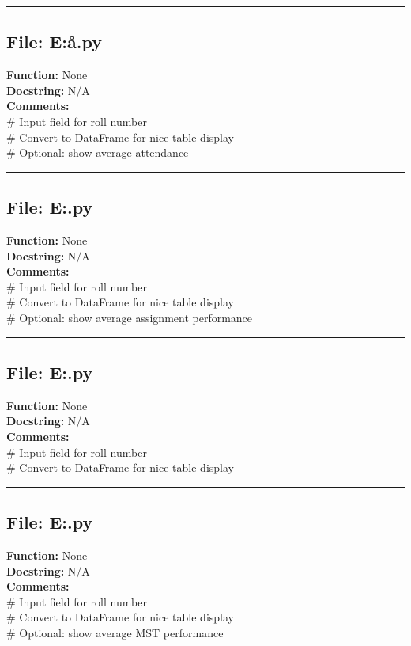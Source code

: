 {\hrule

\subsection*{File: E:\project\capstone\frontend\student\aa.py}
\textbf{Function:} None\\
\textbf{Docstring:} N/A\\
\textbf{Comments:}\\
# Input field for roll number\\
# Convert to DataFrame for nice table display\\
# Optional: show average attendance\\

\hrule

\subsection*{File: E:\project\capstone\frontend\student\am.py}
\textbf{Function:} None\\
\textbf{Docstring:} N/A\\
\textbf{Comments:}\\
# Input field for roll number\\
# Convert to DataFrame for nice table display\\
# Optional: show average assignment performance\\

\hrule

\subsection*{File: E:\project\capstone\frontend\student\ci.py}
\textbf{Function:} None\\
\textbf{Docstring:} N/A\\
\textbf{Comments:}\\
# Input field for roll number\\
# Convert to DataFrame for nice table display\\

\hrule

\subsection*{File: E:\project\capstone\frontend\student\mm.py}
\textbf{Function:} None\\
\textbf{Docstring:} N/A\\
\textbf{Comments:}\\
# Input field for roll number\\
# Convert to DataFrame for nice table display\\
# Optional: show average MST performance\\

}
